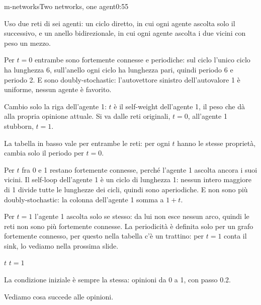 \begin{slide}{m-networks}{Two networks, one agent}{0:55 {\color{red}}}
  \begin{discorso}
    \item Uso due reti di sei agenti: un ciclo diretto, in cui ogni agente ascolta solo il successivo, e un anello bidirezionale, in cui ogni agente ascolta i due vicini con peso un mezzo.
    \item Per $t=0$ entrambe sono fortemente connesse e {\color{red} } {\color{blue}periodiche: sul ciclo l'unico ciclo ha lunghezza 6, sull'anello ogni ciclo ha lunghezza pari, quindi} periodo 6 {\color{red} } e {\color{red}  } {\color{blue}periodo 2. E sono} doubly-stochastic: l'autovettore sinistro dell'autovalore 1 è uniforme, nessun agente è favorito.
    \item Cambio solo la riga dell'agente 1: $t$ è il self-weight dell'agente 1, il peso che dà alla propria opinione attuale. Si va dalle reti originali, $t=0$, all'agente 1 stubborn, $t=1$.
    \item {\color{blue}La tabella in basso vale per entrambe le reti: per ogni $t$ hanno le stesse proprietà, cambia solo il periodo per $t=0$.}
    \item {\color{blue}Per $t$ fra 0 e 1 restano fortemente connesse, perché l'agente 1 ascolta ancora i suoi vicini. Il self-loop dell'agente 1 è un ciclo di lunghezza 1: nessun intero maggiore di 1 divide tutte le lunghezze dei cicli, quindi sono aperiodiche. E non sono più doubly-stochastic: la colonna dell'agente 1 somma a $1+t$.}
    \item {\color{blue}Per $t=1$ l'agente 1 ascolta solo se stesso: da lui non esce nessun arco, quindi le reti non sono più fortemente connesse. La periodicità è definita solo per un grafo fortemente connesso, per questo nella tabella c'è un trattino: per $t=1$ conta il sink, lo vediamo nella prossima slide.}
    \item {\color{red}    } {\color{red}$t$} {\color{red}               } {\color{red}$t=1$} {\color{red}           }
    \item La condizione iniziale è sempre la stessa: opinioni da 0 a 1, con passo 0.2.
    \item Vediamo cosa succede alle opinioni.
  \end{discorso}
\end{slide}

